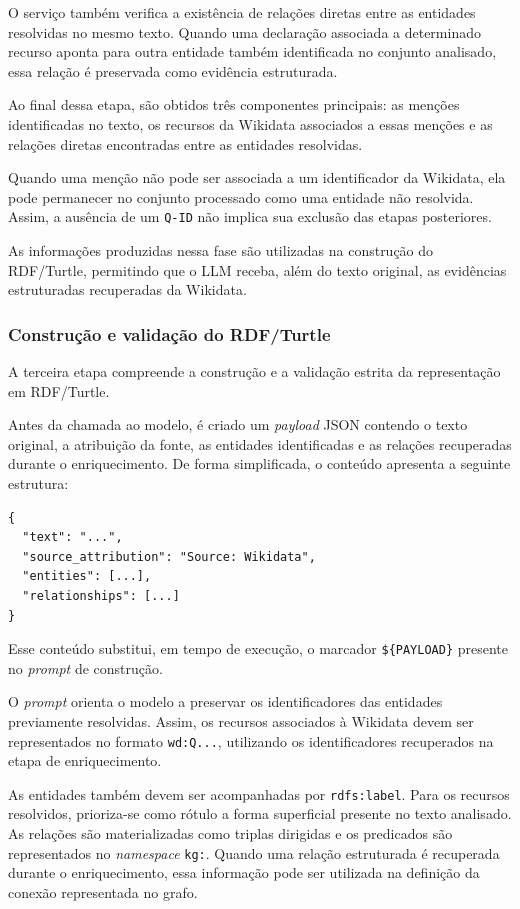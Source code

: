 O serviço também verifica a existência de relações diretas entre as entidades resolvidas no mesmo texto. Quando uma declaração associada a determinado recurso aponta para outra entidade também identificada no conjunto analisado, essa relação é preservada como evidência estruturada.

Ao final dessa etapa, são obtidos três componentes principais: as menções identificadas no texto, os recursos da Wikidata associados a essas menções e as relações diretas encontradas entre as entidades resolvidas.

Quando uma menção não pode ser associada a um identificador da Wikidata, ela pode permanecer no conjunto processado como uma entidade não resolvida. Assim, a ausência de um \texttt{Q-ID} não implica sua exclusão das etapas posteriores.

As informações produzidas nessa fase são utilizadas na construção do RDF/Turtle, permitindo que o LLM receba, além do texto original, as evidências estruturadas recuperadas da Wikidata.


\subsubsection{Construção e validação do RDF/Turtle}

A terceira etapa compreende a construção e a validação estrita da representação em RDF/Turtle.

Antes da chamada ao modelo, é criado um \textit{payload} JSON contendo o texto original, a atribuição da fonte, as entidades identificadas e as relações recuperadas durante o enriquecimento. De forma simplificada, o conteúdo apresenta a seguinte estrutura:

\begin{verbatim}
{
  "text": "...",
  "source_attribution": "Source: Wikidata",
  "entities": [...],
  "relationships": [...]
}
\end{verbatim}

Esse conteúdo substitui, em tempo de execução, o marcador \texttt{\$\{PAYLOAD\}} presente no \textit{prompt} de construção.

O \textit{prompt} orienta o modelo a preservar os identificadores das entidades previamente resolvidas. Assim, os recursos associados à Wikidata devem ser representados no formato \texttt{wd:Q...}, utilizando os identificadores recuperados na etapa de enriquecimento.

As entidades também devem ser acompanhadas por \texttt{rdfs:label}. Para os recursos resolvidos, prioriza-se como rótulo a forma superficial presente no texto analisado. As relações são materializadas como triplas dirigidas e os predicados são representados no \textit{namespace} \texttt{kg:}. Quando uma relação estruturada é recuperada durante o enriquecimento, essa informação pode ser utilizada na definição da conexão representada no grafo.

